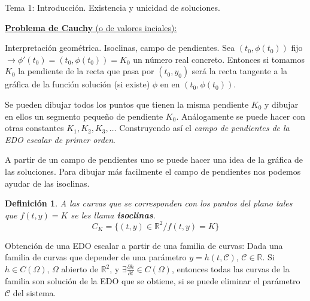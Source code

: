 \documentclass{article}
\newcommand{\R}[1]{$\mathbb{R}^#1$}
\newcommand{\parcial}[2]{\frac{\partial  #1}{\partial #2}}
\newtheorem{definition}{Definición}[section]
\begin{document}
\begin{section}{Tema 1: Introducción. Existencia y unicidad de soluciones.}
\begin{subsection}{\underline{\textbf{Problema de Cauchy} (o de valores inciales):}}
\begin{subsection}{Interpretación geométrica. Isoclinas, campo de pendientes.}
            Sea $(t_0, \phi(t_0))$ fijo $\longrightarrow \phi'(t_0) = (t_0, \phi(t_0)) = K_0$ un número real concreto. Entonces si tomamos $K_0$ la pendiente de la recta que pasa por 
            $(t_0, y_0)$ será la recta tangente a la gráfica de la función solución (si existe) $\phi$ en en $(t_0, \phi(t_0))$.

            Se pueden dibujar todos los puntos que tienen la misma pendiente $K_0$ y dibujar en ellos un segmento pequeño de pendiente $K_0$. Análogamente se puede hacer con otras constantes $K_1, K_2, K_3, \dots$ Construyendo así el \textit{campo de pendientes de la EDO escalar de primer orden}.

            A partir de un campo de pendientes uno se puede hacer una idea de la gráfica de las soluciones. Para dibujar más facilmente el campo de pendientes nos podemos ayudar de las isoclinas.

            \begin{definition}
                A las curvas que se corresponden con los puntos del plano tales que $f(t,y) = K$ se les llama \textbf{isoclinas}.
                \[C_K = \{(t,y)\in \mathbb{R}^2 / f(t,y) = K\}\]
            \end{definition}
            
        \end{subsection}

        \begin{subsection}{Obtención de una EDO escalar a partir de una familia de curvas:}
            Dada una familia de curvas que depender de una parámetro $y=h(t,\mathcal{C})$, $\mathcal{C}\in\mathbb{R}$. Si $h\in C(\Omega)$, $\Omega$ abierto de \R{2}, y $\exists \parcial{h}{t}\in C(\Omega)$, entonces
            todas las curvas de la familia son solución de la EDO que se obtiene, si se puede eliminar el parámetro $\mathcal{C}$ del sistema.
            
        \end{subsection}
    \end{subsection}

\end{section}
\end{document}
